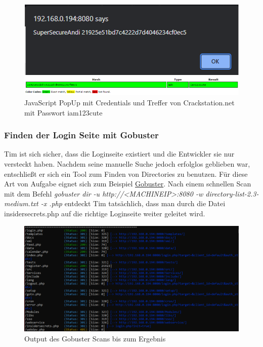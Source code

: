 \documentclass[10pt, a4paper,onecolumn ,titlepage]{article}
\begin{document}
    \begin{figure}[H]
        \centering
        \includegraphics[width=1\textwidth]{VM1_Bilder/XSSHash.PNG}
        \caption{JavaScript PopUp mit Credentials und Treffer von Crackstation.net mit Passwort iam123cute}
        \label{fig:XSSHash}
    \end{figure}

    \subsubsection{Finden der Login Seite mit Gobuster}
    Tim ist sich sicher, dass die Loginseite existiert und die Entwickler sie nur versteckt haben.
    Nachdem seine manuelle Suche jedoch erfolglos geblieben war, entschließt er sich ein Tool zum Finden von Directories zu benutzen.
    Für diese Art von Aufgabe eignet sich zum Beispiel \href{https://github.com/OJ/gobuster}{Gobuster}.
    Nach einem schnellen Scan mit dem Befehl \textit{gobuster dir -u http://<MACHINEIP>:8080 -w directory-list-2.3-medium.txt -x .php} entdeckt Tim tatsächlich, dass man durch die Datei insidersecrets.php auf die richtige Loginseite weiter geleitet wird.

    \begin{figure}[H]
        \centering
        \includegraphics[width=1\textwidth]{VM1_Bilder/GobusterScan.PNG}
        \caption{Output des Gobuster Scans bis zum Ergebnis}
        \label{fig:GobusterScan}
    \end{figure}
\end{document}
